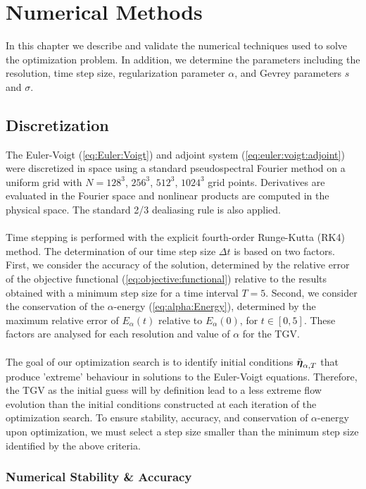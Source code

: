 \chapter{Numerical Methods}\label{chapter:4}

In this chapter we describe and validate the numerical techniques used to solve the optimization problem. In addition, we determine the parameters including the resolution, time step size, regularization parameter $\alpha$, and Gevrey parameters $s$ and $\sigma$.

\section{Discretization}
The Euler-Voigt (\ref{eq:Euler:Voigt}) and adjoint system (\ref{eq:euler:voigt:adjoint}) were discretized in space using a standard pseudospectral Fourier method on a uniform grid with $N=128^3$, $256^3$, $512^3$, $1024^3$ grid points. Derivatives are evaluated in the Fourier space and nonlinear products are computed in the physical space. The standard 2/3 dealiasing rule is also applied.
\\~\\
Time stepping is performed with the explicit fourth-order Runge-Kutta (RK4) method. The determination of our time step size $\Delta t$ is based on two factors. First, we consider the accuracy of the solution, determined by the relative error of the objective functional (\ref{eq:objective:functional}) relative to the results obtained with a minimum step size for a time interval $T=5$. Second, we consider the conservation of the $\alpha$-energy (\ref{eq:alpha:Energy}), determined by the maximum relative error of $E_\alpha(t)$ relative to $E_\alpha(0)$, for $t\in[0,5]$. These factors are analysed for each resolution and value of $\alpha$ for the TGV.
\\~\\
The goal of our optimization search is to identify initial conditions ${\tilde{\boldsymbol \eta}_{\alpha,T}}$ that produce 'extreme' behaviour in solutions to the Euler-Voigt equations. Therefore, the TGV as the initial guess will by definition lead to a less extreme flow evolution than the initial conditions constructed at each iteration of the optimization search. To ensure stability, accuracy, and conservation of $\alpha$-energy upon optimization, we must select a step size smaller than the minimum step size identified by the above criteria.

\subsection{Numerical Stability \& Accuracy}

